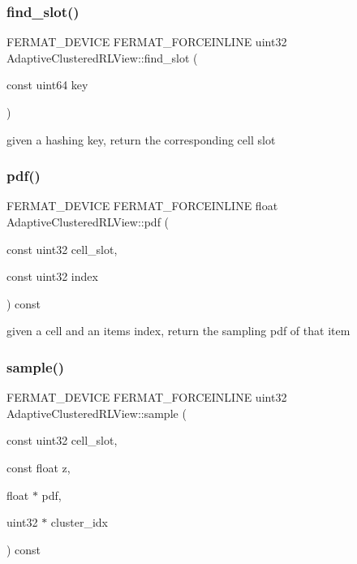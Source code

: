 \subsubsection{\texorpdfstring{find\+\_\+slot()}{find\_slot()}}
{\footnotesize\ttfamily F\+E\+R\+M\+A\+T\+\_\+\+D\+E\+V\+I\+CE F\+E\+R\+M\+A\+T\+\_\+\+F\+O\+R\+C\+E\+I\+N\+L\+I\+NE uint32 Adaptive\+Clustered\+R\+L\+View\+::find\+\_\+slot (\begin{DoxyParamCaption}\item[{const uint64}]{key }\end{DoxyParamCaption})}

given a hashing key, return the corresponding cell slot \mbox{\label{struct_adaptive_clustered_r_l_view_a85017597296cbd1b1db695f5affb4ff8}} 
\subsubsection{\texorpdfstring{pdf()}{pdf()}}
{\footnotesize\ttfamily F\+E\+R\+M\+A\+T\+\_\+\+D\+E\+V\+I\+CE F\+E\+R\+M\+A\+T\+\_\+\+F\+O\+R\+C\+E\+I\+N\+L\+I\+NE float Adaptive\+Clustered\+R\+L\+View\+::pdf (\begin{DoxyParamCaption}\item[{const uint32}]{cell\+\_\+slot,  }\item[{const uint32}]{index }\end{DoxyParamCaption}) const}

given a cell and an item\textquotesingle{}s index, return the sampling pdf of that item \mbox{\label{struct_adaptive_clustered_r_l_view_adc3c05a08f010f0e682b332dceb6f15f}} 
\subsubsection{\texorpdfstring{sample()}{sample()}}
{\footnotesize\ttfamily F\+E\+R\+M\+A\+T\+\_\+\+D\+E\+V\+I\+CE F\+E\+R\+M\+A\+T\+\_\+\+F\+O\+R\+C\+E\+I\+N\+L\+I\+NE uint32 Adaptive\+Clustered\+R\+L\+View\+::sample (\begin{DoxyParamCaption}\item[{const uint32}]{cell\+\_\+slot,  }\item[{const float}]{z,  }\item[{float $\ast$}]{pdf,  }\item[{uint32 $\ast$}]{cluster\+\_\+idx }\end{DoxyParamCaption}) const}

